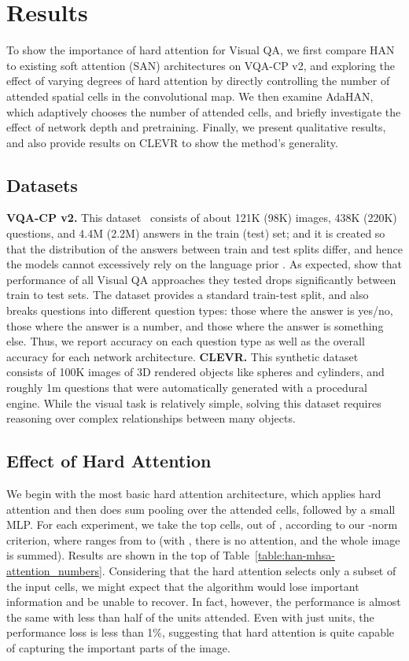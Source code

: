 \section{Results}
\label{sec:results}
To show the importance of hard attention for Visual QA, we first compare HAN to existing soft attention (SAN) architectures on VQA-CP v2, and exploring the effect of varying degrees of hard attention by directly controlling the number of attended spatial cells in the convolutional map. 
We then examine AdaHAN, which adaptively chooses the number of attended cells, and briefly investigate the effect of network depth and pretraining.
Finally, we present qualitative results, and also provide results on CLEVR to show the method's generality.

\subsection{Datasets}
\textbf{VQA-CP v2.} This dataset~\cite{agrawal2017don}
consists of about 121K (98K) images, 438K (220K) questions, and 4.4M (2.2M) answers in the train (test) set; and it is created so that the distribution of the answers between train and test splits differ, and hence the models cannot excessively rely on the language prior \cite{agrawal2017don}. As expected, \cite{agrawal2017don} show that performance of all Visual QA approaches they tested drops significantly between train to test sets. 
The dataset provides a standard train-test split, and also breaks questions into different question types: those where the answer is yes/no, those where the answer is a number, and those where the answer is something else. Thus, we report accuracy on each question type as well as the overall accuracy for each network architecture.
\newline
\textbf{CLEVR.} This synthetic dataset~\cite{johnson2017clevr} consists of 100K images of 3D rendered objects like spheres and cylinders, and roughly 1m questions that were automatically generated with a procedural engine.  While the visual task is relatively simple, solving this dataset requires reasoning over complex relationships between many objects.

\subsection{Effect of Hard Attention}
We begin with the most basic hard attention architecture, which applies hard attention and then does sum pooling over the attended cells, followed by a small MLP.
For each experiment, we take the top  cells, out of , according to our -norm criterion, where  ranges from  to  (with , there is no attention, and the whole image is summed).  
Results are shown in the top of Table~\ref{table:han-mhsa-attention_numbers}.  
Considering that the hard attention 
selects only a subset of the input cells, 
we might expect that the algorithm would lose important information and be unable to recover.
In fact, however, the performance is almost the same with less than half of the units attended.
Even with just  units, the performance loss is less than 1\%, suggesting that hard attention is quite capable of capturing the important parts of the image. 


